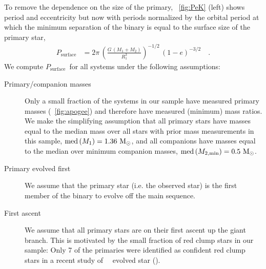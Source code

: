 \documentclass[modern, letterpaper]{aastex62}
\newcommand{\apogee}{\project{\acronym{APOGEE}}}
\newcommand{\DR}{\acronym{DR14}}
\newcommand{\med}[1]{\ensuremath{\textrm{med}\left(#1\right)}}
\newcommand{\Psurf}{\ensuremath{P_\textrm{surface}}}
\begin{document}
To remove the dependence on the size of the primary, \figurename~\ref{fig:PeK}
(left) shows period and eccentricity but now with periods normalized by the
orbital period at which the minimum separation of the binary is equal to the
surface size of the primary star,
\begin{align}
    \Psurf &= 2\pi \,
        \left(\frac{G \, (M_1+M_2)}{R_1^3}\right)^{-1/2} \,
        \left(1-e\right)^{-3/2}
    \quad . \label{eq:Psurf}
\end{align}
We compute \Psurf\ for all systems under the following assumptions:
\begin{description}
    \item[Primary/companion masses] Only a small fraction of the systems in our
    sample have measured primary masses (\figurename~\ref{fig:apogee}) and
    therefore have measured (minimum) mass ratios.
    We make the simplifying assumption that all primary stars have masses equal
    to the median mass over all stars with prior mass measurements in this
    sample, $\med{M_1} = 1.36~\msun$, and all companions have masses equal to
    the median over minimum companion masses, $\med{M_{2, \textrm{min}}} =
    0.5~\msun$.
    \item[Primary evolved first] We assume that the primary star (i.e. the
    observed star) is the first member of the binary to evolve off the main
    sequence.
    \item[First ascent] We assume that all primary stars are on their first
    ascent up the giant branch.
    This is motivated by the small fraction of red clump stars in our sample:
    Only 7 of the primaries were identified as confident red clump stars in a
    recent study of \apogee\ \DR\ evolved star (\citealt{Ting:2018}).
\end{description}
\end{document}
